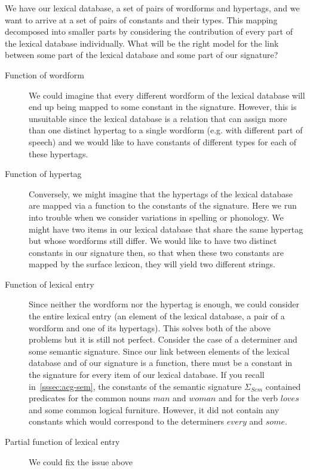 We have our lexical database, a set of pairs of wordforms and hypertags,
and we want to arrive at a set of pairs of constants and their
types. This mapping decomposed into smaller parts by considering the
contribution of every part of the lexical database individually. What
will be the right model for the link between some part of the lexical
database and some part of our signature?

\begin{description}
  \item[Function of wordform] We could imagine that every different
    wordform of the lexical database will end up being mapped to some
    constant in the signature. However, this is unsuitable since the
    lexical database is a relation that can assign more than one
    distinct hypertag to a single wordform (e.g. with different part of
    speech) and we would like to have constants of different types for
    each of these hypertags.
  \item[Function of hypertag] Conversely, we might imagine that the
    hypertags of the lexical database are mapped via a function to the
    constants of the signature. Here we run into trouble when we
    consider variations in spelling or phonology. We might have two
    items in our lexical database that share the same hypertag but whose
    wordforms still differ. We would like to have two distinct constants
    in our signature then, so that when these two constants are mapped
    by the surface lexicon, they will yield two different strings.
  \item[Function of lexical entry] Since neither the wordform nor the
    hypertag is enough, we could consider the entire lexical entry (an
    element of the lexical database, a pair of a wordform and one of its
    hypertags). This solves both of the above problems but it is still
    not perfect. Consider the case of a determiner and some semantic
    signature. Since our link between elements of the lexical database
    and of our signature is a function, there must be a constant in the
    signature for every item of our lexical database. If you recall
    in~\ref{sssec:acg-sem}, the constants of the semantic signature
    $\Sigma_{Sem}$ contained predicates for the common nouns $man$ and
    $woman$ and for the verb $loves$ and some common logical
    furniture. However, it did not contain any constants which would
    correspond to the determiners $every$ and $some$.
  \item[Partial function of lexical entry] We could fix the issue above

\end{description}
